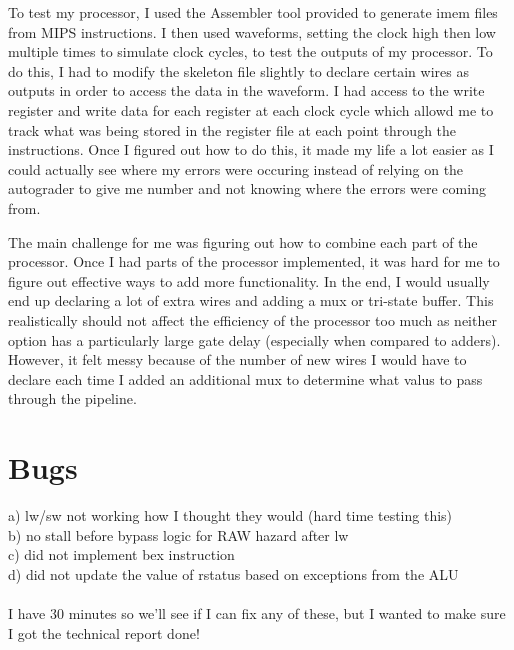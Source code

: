 \documentclass[letterpaper]{article} %
\begin{document}
To test my processor, I used the Assembler tool provided to generate imem files from MIPS instructions. I then used waveforms, setting the clock high then low multiple times to simulate clock cycles, to test the outputs of my processor. To do this, I had to modify the skeleton file slightly to declare certain wires as outputs in order to access the data in the waveform. I had access to the write register and write data for each register at each clock cycle which allowd me to track what was being stored in the register file at each point through the instructions. Once I figured out how to do this, it made my life a lot easier as I could actually see where my errors were occuring instead of relying on the autograder to give me number and not knowing where the errors were coming from. 

The main challenge for me was figuring out how to combine each part of the processor. Once I had parts of the processor implemented, it was hard for me to figure out effective ways to add more functionality. In the end, I would usually end up declaring a lot of extra wires and adding a mux or tri-state buffer. This realistically should not affect the efficiency of the processor too much as neither option has a particularly large gate delay (especially when compared to adders). However, it felt messy because of the number of new wires I would have to declare each time I added an additional mux to determine what valus to pass through the pipeline. 

\section*{Bugs}
a) lw/sw not working how I thought they would (hard time testing this)\\
b) no stall before bypass logic for RAW hazard after lw \\
c) did not implement bex instruction \\
d) did not update the value of rstatus based on exceptions from the ALU \\  \\
I have 30 minutes so we'll see if I can fix any of these, but I wanted to make sure I got the technical report done!
\end{document}
